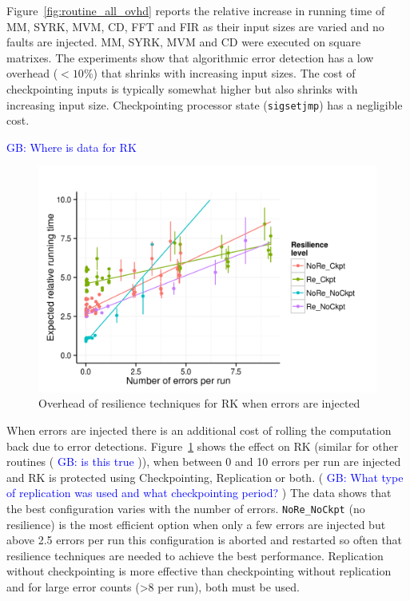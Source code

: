 \documentclass[10pt, conference, compsocconf]{IEEEtran}
\newcommand{\greg}[1]{%
  \textcolor{blue}{GB: #1}
}
\begin{document}
Figure~\ref{fig:routine_all_ovhd} reports the relative increase in running time of MM, SYRK, MVM, CD, FFT and FIR as their input sizes are varied and no faults are injected.
MM, SYRK, MVM and CD were executed on square matrixes.
The experiments show that algorithmic error detection has a low overhead ($<10\%$) that shrinks with increasing input sizes.
The cost of checkpointing inputs is typically somewhat higher but also shrinks with increasing input size.
Checkpointing processor state (\texttt{sigsetjmp}) has a negligible cost.

\greg{Where is data for RK}

\begin{figure}[ht!]
\centering
\includegraphics[width=1.00\columnwidth]{figs/4_1_2_Exp2_Expected_Running_Time_Needed.png}
\caption{Overhead of resilience techniques for RK when errors are injected}
\label{fig:rk_routine_exp_exec}
\end{figure}

When errors are injected there is an additional cost of rolling the computation back due to error detections.
Figure~\ref{fig:rk_routine_exp_exec} shows the effect on RK (similar for other routines (\greg{is this true})), when between 0 and 10 errors per run are injected and RK is protected using Checkpointing, Replication or both.
(\greg{What type of replication was used and what checkpointing period?})
The data shows that the best configuration varies with the number of errors.
\texttt{NoRe\_NoCkpt} (no resilience) is the most efficient option when only a few errors are injected but above 2.5 errors per run this configuration is aborted and restarted so often that resilience techniques are needed to achieve the best performance.
Replication without checkpointing is more effective than checkpointing without replication and for large error counts (>8 per run), both must be used.
\end{document}
